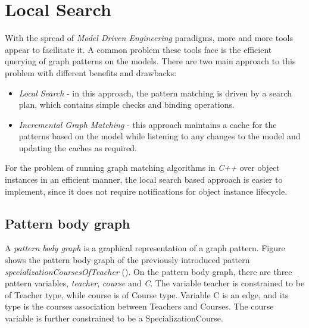 \chapter{Local Search}


With the spread of \emph{Model Driven Engineering} paradigms, more and more
tools appear to facilitate it. A common problem these tools face is the
efficient querying of graph patterns on the models. There are two main approach
to this problem with different benefits and drawbacks:

\begin{itemize}
  \item \emph{Local Search} - in this approach, the pattern matching is driven
  by a search plan, which contains simple checks and binding operations.
  \item \emph{Incremental Graph Matching} - this approach maintains a cache
  for the patterns based on the model while listening to any changes to the
  model and updating the caches as required.
\end{itemize}

For the problem of running graph matching algorithms in \emph{C++} over object
instances in an efficient manner, the local search based approach is easier to
implement, since it does not require notifications for object instance
lifecycle.

\section{Pattern body graph}\label{sec:PatternBodyGraph}

A \emph{pattern body graph} is a graphical representation of a graph pattern.
Figure  shows the pattern body graph of the previously
introduced pattern \emph{specializationCoursesOfTeacher}
(). On the pattern body graph, there are three
pattern variables, \emph{teacher}, \emph{course} and \emph{C}. The variable
teacher is constrained to be of Teacher type, while course is of Course type.
Variable C is an edge, and its type is the courses association between Teachers
and Courses. The course variable is further constrained to be a
SpecializationCourse.

